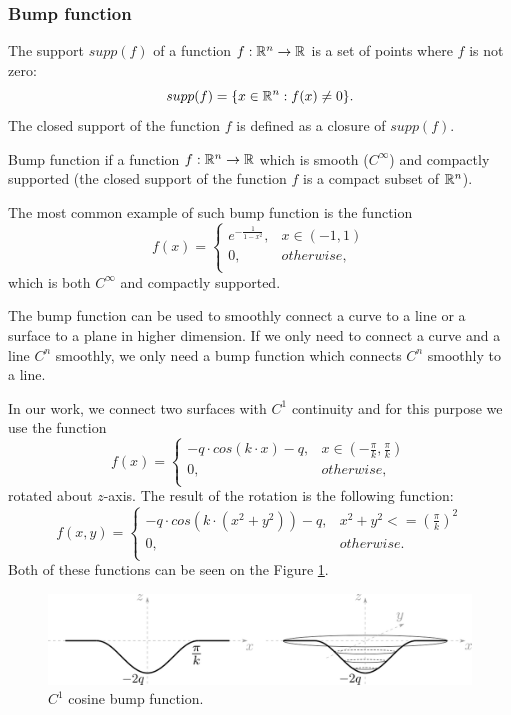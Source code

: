 \subsubsection*{Bump function}
\begin{definition}
The support $supp(f)$ of a function $f: \mathbb{R}^n \to \mathbb{R}$ is a set of points where $f$ is not
zero: $$supp(f) = \{ x\in \mathbb{R}^n : f(x)\neq 0 \}.$$
The closed support of the function $f$ is defined as a closure of $supp(f)$.
\end{definition}
Bump function if a function $f:\mathbb{R}^n \to \mathbb{R}$ which is smooth ($C^\infty$) and
compactly supported (the closed support of the function $f$ is a compact subset
of $\mathbb{R}^n$).

The most common example of such bump function is the function 
$$f(x)= \left\{
    \begin{array}{ll}
        e^{-\frac{1}{1-x^2}}, & x \in (-1, 1) \\
          0, & otherwise,\\
    \end{array} 
    \right. $$
which is both $C^\infty$ and compactly supported.

The bump function can be used to smoothly connect a curve to a line or a surface to a
plane in higher dimension. If we only need to connect a curve and a line $C^n$ smoothly, 
we only need a bump function which connects $C^n$ smoothly to a line.

In our work, we connect two surfaces with $C^1$ continuity and for this purpose
we use the function
$$f(x)= \left\{
    \begin{array}{ll}
        -q \cdot cos(k \cdot x)-q, & x \in (-\frac{\pi}{k}, \frac{\pi}{k}) \\
        0, & otherwise,\\
    \end{array} 
    \right. $$
rotated about $z$-axis.
The result of the rotation is the following function:
$$f(x, y) = \left\{
    \begin{array}{ll}
        -q \cdot cos(k \cdot (x^2+y^2))-q, & x^2+y^2<=(\frac{\pi}{k})^2 \\
        0, & otherwise.\\
    \end{array} 
    \right. $$
Both of these functions can be seen on the Figure \ref{img:21}.
\begin{figure}
    \centerline{\includegraphics[scale=0.5]{images/img21}}
    \caption[$C^1$ cosine bump function.]
    {$C^1$ cosine bump function.}
    \label{img:21}
\end{figure}

